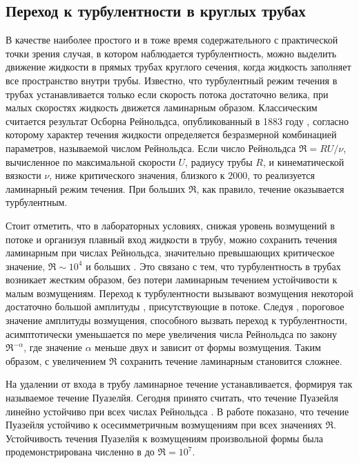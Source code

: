 	\subsection{Переход к турбулентности в круглых трубах}

В качестве наиболее простого и в тоже время содержательного с практической точки зрения случая, в котором наблюдается турбулентность, можно выделить движение жидкости в прямых трубах круглого сечения, когда жидкость заполняет все пространство внутри трубы. Известно, что турбулентный режим течения в трубах устанавливается только если скорость потока достаточно велика, при малых скоростях жидкость движется ламинарным образом. Классическим считается результат Осборна Рейнольдса, опубликованный в 1883 году \cite{Reynolds1883}, согласно которому характер течения жидкости определяется безразмерной комбинацией параметров, называемой числом Рейнольдса. Если число Рейнольдса $\Re = RU/\nu$, вычисленное по максимальной скорости $U$, радиусу трубы $R$, и кинематической вязкости $\nu$, ниже критического значения, близкого к $2000$, то реализуется ламинарный режим течения. При больших $\Re$, как правило, течение оказывается турбулентным. 

Стоит отметить, что в лабораторных условиях, снижая уровень возмущений в потоке и организуя плавный вход жидкости в трубу, можно сохранить течения ламинарным при числах Рейнольдса, значительно превышающих критическое значение, $\Re \sim 10^4$ и больших \cite{Wygnanski1973, Darbyshire1995, vanDoorne2009}. Это связано с тем, что турбулентность в трубах возникает жестким образом, без потери ламинарным течением устойчивости к малым возмущениям. Переход к турбулентности вызывают возмущения некоторой достаточно большой амплитуды \cite{Grossmann2000}, присутствующие в потоке. Следуя \cite{Darbyshire1995, Hof2003, Peixinho2007, Mellibovsky2009critical}, пороговое значение амплитуды возмущения, способного вызвать переход к турбулентности, асимптотически уменьшается по мере увеличения числа Рейнольдса по закону $\Re^{-\alpha}$, где значение $\alpha$ меньше двух и зависит от формы возмущения. Таким образом, с увеличением $\Re$ сохранить течение ламинарным становится сложнее. 

На удалении от входа в трубу ламинарное течение устанавливается, формируя так называемое течение Пуазелйя. Сегодня принято считать, что течение Пуазейля линейно устойчиво при всех числах Рейнольдса \cite{Kerswell2005}. В работе \cite{Salwen1980} показано, что течение Пуазейля устойчиво к осесимметричным возмущениям при всех значениях $\Re$. Устойчивость течения Пуазелйя к возмущениям произвольной формы была продемонстрирована численно в \cite{Meseguer2003} до $\Re = 10^7$. 

